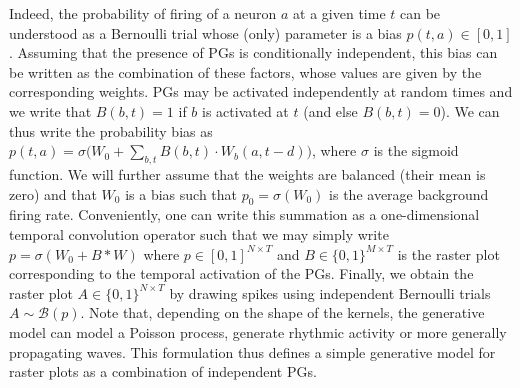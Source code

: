 \documentclass[11pt]{article}
\begin{document}
Indeed, the probability of firing of a neuron $a$ at a given time $t$ can be understood as a Bernoulli trial whose (only) parameter is a bias $p(t, a) \in [0, 1]$. Assuming that the presence of PGs is conditionally independent, this bias can be written as the combination of these factors, whose values are given by the corresponding weights. PGs may be activated independently at random times and  we write that $B(b, t)=1$ if $b$ is activated at $t$ (and else $B(b, t)=0$). We can thus write the probability bias as %
$%
p(t, a) = \sigma\big(W_0 + \sum_{b, t} B(b, t) \cdot W_b(a, t-d) \big)  
$, %
where $\sigma$ is the sigmoid function. We will further assume that the weights are balanced (their mean is zero) and that $W_0$ is a bias such that $p_0=\sigma(W_0)$ is the average background firing rate. Conveniently, one can write this summation as a one-dimensional temporal convolution operator such that we may simply write $p = \sigma(W_0 + B \ast W )$ where  $p\in [ 0, 1]^{N\times T}$ and $B\in \{0, 1\}^{M\times T}$ is the raster plot corresponding to the temporal activation of the PGs. Finally, we obtain the raster plot $A\in \{0, 1\}^{N\times T}$ by drawing spikes using independent Bernoulli trials $A \sim \mathcal{B}(p)$. Note that, depending on the shape of the kernels, the generative model can model a Poisson process, generate rhythmic activity or more generally propagating waves. This formulation thus defines a simple generative model for raster plots as a combination of independent PGs. 
\end{document}
